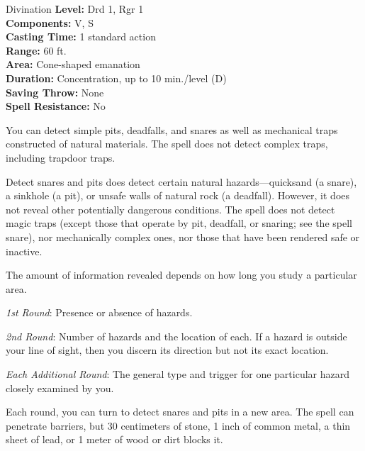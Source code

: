 {Divination}
{
	\textbf{Level:}
	Drd 1, Rgr 1\\
	\textbf{Components:}
	V, S\\
	\textbf{Casting Time:}
	1 standard action\\
	\textbf{Range:}
	60 ft.\\
	\textbf{Area:}
	Cone-shaped emanation\\
	\textbf{Duration:}
	Concentration, up to 10 min./level (D)\\
	\textbf{Saving Throw:}
	None\\
	\textbf{Spell Resistance:}
	No\\
}
{
	You can detect simple pits, deadfalls, and snares as well as mechanical traps constructed of natural materials. The spell does not detect complex traps, including trapdoor traps.

	Detect snares and pits does detect certain natural hazards---quicksand (a snare), a sinkhole (a pit), or unsafe walls of natural rock (a deadfall). However, it does not reveal other potentially dangerous conditions. The spell does not detect magic traps (except those that operate by pit, deadfall, or snaring; see the spell snare), nor mechanically complex ones, nor those that have been rendered safe or inactive.

	The amount of information revealed depends on how long you study a particular area.

	\textit{1st Round}:
	Presence or absence of hazards.

	\textit{2nd Round}:
	Number of hazards and the location of each. If a hazard is outside your line of sight, then you discern its direction but not its exact location.

	\textit{Each Additional Round}:
	The general type and trigger for one particular hazard closely examined by you.

	Each round, you can turn to detect snares and pits in a new area. The spell can penetrate barriers, but 30 centimeters of stone, 1 inch of common metal, a thin sheet of lead, or 1 meter of wood or dirt blocks it.

}
